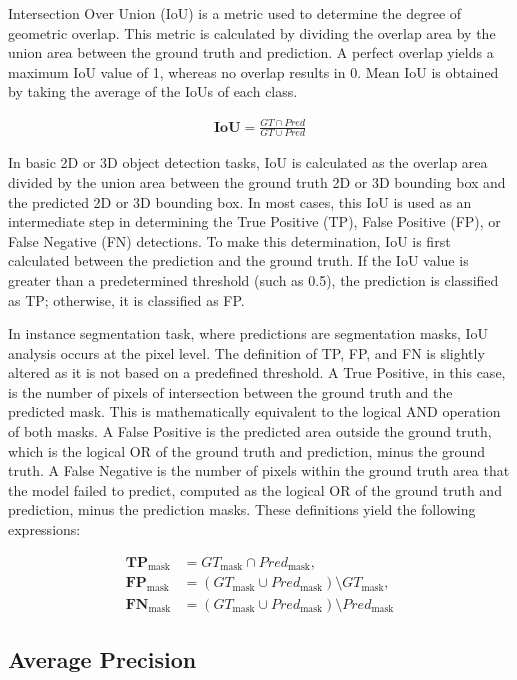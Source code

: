 Intersection Over Union (IoU) is a metric used to determine the degree of geometric overlap. This metric is calculated by dividing the overlap area by the union area between the ground truth and prediction. A perfect overlap yields a maximum IoU value of 1, whereas no overlap results in 0. Mean IoU is obtained by taking the average of the IoUs of each class.

\begin{align*}
	\textbf{IoU} = \frac{{GT \cap Pred}}{{GT \cup Pred}}
\end{align*}

In basic 2D or 3D object detection tasks, IoU is calculated as the overlap area divided by the union area between the ground truth 2D or 3D bounding box and the predicted 2D or 3D bounding box. In most cases, this IoU is used as an intermediate step in determining the True Positive (TP), False Positive (FP), or False Negative (FN) detections. To make this determination, IoU is first calculated between the prediction and the ground truth. If the IoU value is greater than a predetermined threshold (such as 0.5), the prediction is classified as TP; otherwise, it is classified as FP.

In instance segmentation task, where predictions are segmentation masks, IoU analysis occurs at the pixel level. The definition of TP, FP, and FN is slightly altered as it is not based on a predefined threshold. A True Positive, in this case, is the number of pixels of intersection between the ground truth and the predicted mask. This is mathematically equivalent to the logical AND operation of both masks. A False Positive is the predicted area outside the ground truth, which is the logical OR of the ground truth and prediction, minus the ground truth. A False Negative is the number of pixels within the ground truth area that the model failed to predict, computed as the logical OR of the ground truth and prediction, minus the prediction masks. These definitions yield the following expressions:

\begin{align*}
	\textbf{TP}_{\text{mask}} &= GT_{\text{mask}} \cap Pred_{\text{mask}},  \\ 
	\textbf{FP}_{\text{mask}}  &= (GT_{\text{mask}} \cup Pred_{\text{mask}}) \setminus GT_{\text{mask}},  \\ 
	\textbf{FN}_{\text{mask}}  &= (GT_{\text{mask}} \cup Pred_{\text{mask}}) \setminus Pred_{\text{mask}}
\end{align*}

\subsection{Average Precision}

